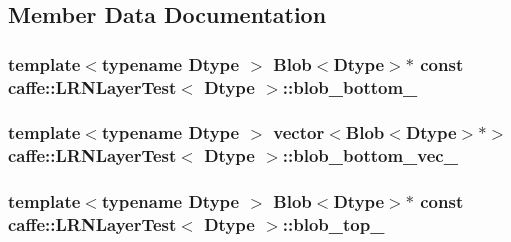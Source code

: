 \subsection{Member Data Documentation}
\hypertarget{classcaffe_1_1_l_r_n_layer_test_a14bf7b99347b9c3027faf75ea1a52ded}{
\subsubsection[{blob\+\_\+bottom\+\_\+}]{\setlength{\rightskip}{0pt plus 5cm}template$<$typename Dtype $>$ {\bf Blob}$<$Dtype$>$$\ast$ const {\bf caffe\+::\+L\+R\+N\+Layer\+Test}$<$ Dtype $>$\+::blob\+\_\+bottom\+\_\+\hspace{0.3cm}{\ttfamily [protected]}}}\label{classcaffe_1_1_l_r_n_layer_test_a14bf7b99347b9c3027faf75ea1a52ded}
\hypertarget{classcaffe_1_1_l_r_n_layer_test_a9c191aefd4a408d2a43035dd6015c1be}{
\subsubsection[{blob\+\_\+bottom\+\_\+vec\+\_\+}]{\setlength{\rightskip}{0pt plus 5cm}template$<$typename Dtype $>$ vector$<${\bf Blob}$<$Dtype$>$$\ast$$>$ {\bf caffe\+::\+L\+R\+N\+Layer\+Test}$<$ Dtype $>$\+::blob\+\_\+bottom\+\_\+vec\+\_\+\hspace{0.3cm}{\ttfamily [protected]}}}\label{classcaffe_1_1_l_r_n_layer_test_a9c191aefd4a408d2a43035dd6015c1be}
\hypertarget{classcaffe_1_1_l_r_n_layer_test_a26ac20ad93eaec764e8595e84939964d}{
\subsubsection[{blob\+\_\+top\+\_\+}]{\setlength{\rightskip}{0pt plus 5cm}template$<$typename Dtype $>$ {\bf Blob}$<$Dtype$>$$\ast$ const {\bf caffe\+::\+L\+R\+N\+Layer\+Test}$<$ Dtype $>$\+::blob\+\_\+top\+\_\+\hspace{0.3cm}{\ttfamily [protected]}}}\label{classcaffe_1_1_l_r_n_layer_test_a26ac20ad93eaec764e8595e84939964d}
